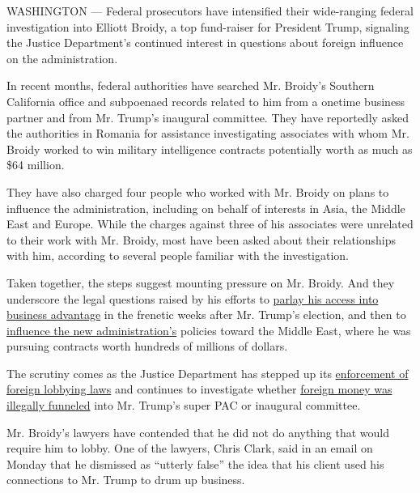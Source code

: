 WASHINGTON --- Federal prosecutors have intensified their wide-ranging
federal investigation into Elliott Broidy, a top fund-raiser for
President Trump, signaling the Justice Department's continued interest
in questions about foreign influence on the administration.

In recent months, federal authorities have searched Mr. Broidy's
Southern California office and subpoenaed records related to him from a
onetime business partner and from Mr. Trump's inaugural committee. They
have reportedly asked the authorities in Romania for assistance
investigating associates with whom Mr. Broidy worked to win military
intelligence contracts potentially worth as much as \$64 million.

They have also charged four people who worked with Mr. Broidy on plans
to influence the administration, including on behalf of interests in
Asia, the Middle East and Europe. While the charges against three of his
associates were unrelated to their work with Mr. Broidy, most have been
asked about their relationships with him, according to several people
familiar with the investigation.

Taken together, the steps suggest mounting pressure on Mr. Broidy. And
they underscore the legal questions raised by his efforts to
\href{https://www.nytimes.com/2018/03/25/us/politics/elliott-broidy-trump-access-circinus-lobbying.html}{parlay
his access into business advantage} in the frenetic weeks after Mr.
Trump's election, and then to
\href{https://www.nytimes.com/2018/03/21/us/politics/george-nader-elliott-broidy-uae-saudi-arabia-white-house-influence.html}{influence
the new administration's} policies toward the Middle East, where he was
pursuing contracts worth hundreds of millions of dollars.

The scrutiny comes as the Justice Department has stepped up its
\href{https://www.nytimes.com/2019/03/06/us/politics/fara-task-force-justice-department.html}{enforcement
of foreign lobbying laws} and continues to investigate whether
\href{https://www.nytimes.com/2018/12/13/us/politics/trump-inauguration-investigation.html}{foreign
money was illegally funneled} into Mr. Trump's super PAC or inaugural
committee.

Mr. Broidy's lawyers have contended that he did not do anything that
would require him to lobby. One of the lawyers, Chris Clark, said in an
email on Monday that he dismissed as ``utterly false'' the idea that his
client used his connections to Mr. Trump to drum up business.

